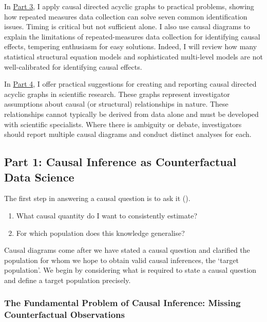 \documentclass[
  single column]{article}
\providecommand{\tightlist}{%
  \setlength{\itemsep}{0pt}\setlength{\parskip}{0pt}}\usepackage{longtable,booktabs,array}
\begin{document}
In \hyperref[id-sec-3]{Part 3}, I apply causal directed acyclic graphs
to practical problems, showing how repeated measures data collection can
solve seven common identification issues. Timing is critical but not
sufficient alone. I also use causal diagrams to explain the limitations
of repeated-measures data collection for identifying causal effects,
tempering enthusiasm for easy solutions. Indeed, I will review how many
statistical structural equation models and sophisticated multi-level
models are not well-calibrated for identifying causal effects.

In \hyperref[id-sec-4]{Part 4}, I offer practical suggestions for
creating and reporting causal directed acyclic graphs in scientific
research. These graphs represent investigator assumptions about causal
(or structural) relationships in nature. These relationships cannot
typically be derived from data alone and must be developed with
scientific specialists. Where there is ambiguity or debate,
investigators should report multiple causal diagrams and conduct
distinct analyses for each.

\subsection{Part 1: Causal Inference as Counterfactual Data
Science}\label{id-sec-1}

The first step in answering a causal question is to ask it
().

\begin{enumerate}
\def\labelenumi{\arabic{enumi}.}
\tightlist
\item
  What causal quantity do I want to consistently estimate?
\item
  For which population does this knowledge generalise?
\end{enumerate}

Causal diagrams come after we have stated a causal question and
clarified the population for whom we hope to obtain valid causal
inferences, the `target population'. We begin by considering what is
required to state a causal question and define a target population
precisely.

\subsubsection{The Fundamental Problem of Causal Inference: Missing
Counterfactual
Observations}\label{the-fundamental-problem-of-causal-inference-missing-counterfactual-observations}
\end{document}
